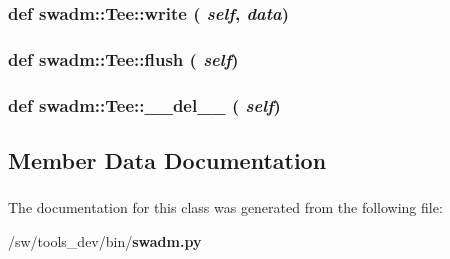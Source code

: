 \subsubsection{\setlength{\rightskip}{0pt plus 5cm}def swadm::Tee::write ( {\em self},  {\em data})}\label{classswadm_1_1Tee_67ad1db5fba69ae41996fbf67f9e6ea2}


\subsubsection{\setlength{\rightskip}{0pt plus 5cm}def swadm::Tee::flush ( {\em self})}\label{classswadm_1_1Tee_0e0cc92f8fd0b5be639909bcc8e2865d}


\subsubsection{\setlength{\rightskip}{0pt plus 5cm}def swadm::Tee::\_\-\_\-del\_\-\_\- ( {\em self})}\label{classswadm_1_1Tee_e331f13b266a46db47fbcc85c472339b}




\subsection{Member Data Documentation}
\subsubsection{}\label{classswadm_1_1Tee_84d0b5b6e375982caecc6582b6b11473}


\subsubsection{}\label{classswadm_1_1Tee_e78274d1a8f7752c29057f91d056210d}




The documentation for this class was generated from the following file:\begin{CompactItemize}
\item 
/sw/tools\_\-dev/bin/{\bf swadm.py}\end{CompactItemize}
